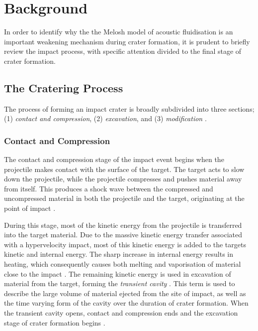 \section{Background}

In order to identify why the the Melosh model of acoustic fluidisation is an important weakening mechanism during crater formation, it is prudent to briefly review the impact process, with specific attention divided to the final stage of crater formation. 

\subsection{The Cratering Process}

The process of forming an impact crater is broadly subdivided into three sections; (1) \textit{contact and compression}, (2) \textit{excavation}, and (3) \textit{modification} \citep{osinski2012impact}.

\subsubsection{Contact and Compression}

The contact and compression stage of the impact event begins when the projectile makes contact with the surface of the target. The target acts to slow down the projectile, while the projectile compresses and pushes material away from itself. This produces a shock wave between the compressed and uncompressed material in both the projectile and the target, originating at the point of impact \citep{collins2002numerical}.\bigskip

During this stage, most of the kinetic energy from the projectile is transferred into the target material. Due to the massive kinetic energy transfer associated with a hypervelocity impact, most of this kinetic energy is added to the targets kinetic and internal energy. The sharp increase in internal energy results in heating, which consequently causes both melting and vaporisation of material close to the impact \citep{collins2002numerical}. The remaining kinetic energy is used in excavation of material from the target, forming the \textit{transient cavity} \citep{grieve1982method}. This term is used to describe the large volume of material ejected from the site of impact, as well as the time varying form of the cavity over the duration of crater formation. When the transient cavity opens, contact and compression ends and the excavation stage of crater formation begins \citep{collins2002numerical}.

